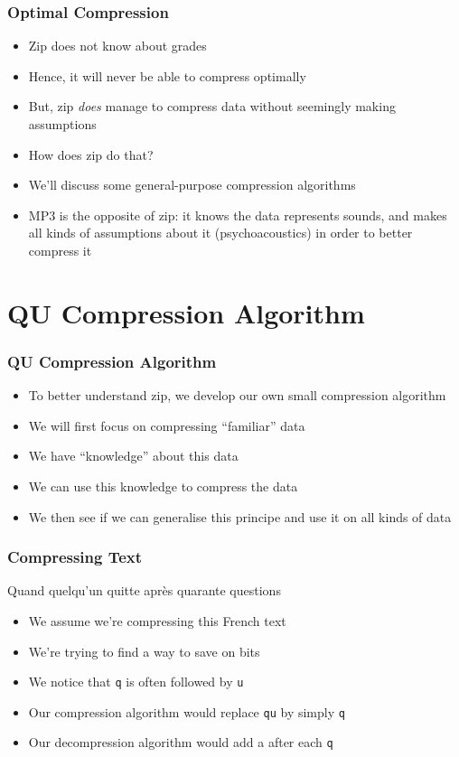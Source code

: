 \begin{frame}
  \frametitle{Optimal Compression}
  \begin{itemize}
    \item Zip does not know about grades
    \item Hence, it will never be able to compress optimally
    \item But, zip \emph{does} manage to compress data without seemingly making assumptions
    \item How does zip do that?
    \item We'll discuss some general-purpose compression algorithms
    \item MP3 is the opposite of zip: it knows the data represents sounds,
          and makes all kinds of assumptions about it (psychoacoustics)
          in order to better compress it
  \end{itemize}
\end{frame}

\section{QU Compression Algorithm}

\begin{frame}
  \tableofcontents[currentsection]
\end{frame}

\begin{frame}
  \frametitle{QU Compression Algorithm}
  \begin{itemize}
    \item To better understand zip, we develop our own small compression algorithm
    \item We will first focus on compressing ``familiar'' data
    \item We have ``knowledge'' about this data
    \item We can use this knowledge to compress the data
    \item We then see if we can generalise this principe and use
          it on all kinds of data
  \end{itemize}
\end{frame}

\begin{frame}
  \frametitle{Compressing Text}
  \begin{center}
    Quand quelqu'un quitte apr\`es quarante questions
  \end{center}
  \begin{itemize}
    \item We assume we're compressing this French text
    \item We're trying to find a way to save on bits
    \item We notice that {\tt q} is often followed by {\tt u}
    \item Our compression algorithm would replace {\tt qu} by simply {\tt q}
    \item Our decompression algorithm would add a {\tt } after each {\tt q}
  \end{itemize}
\end{frame}

